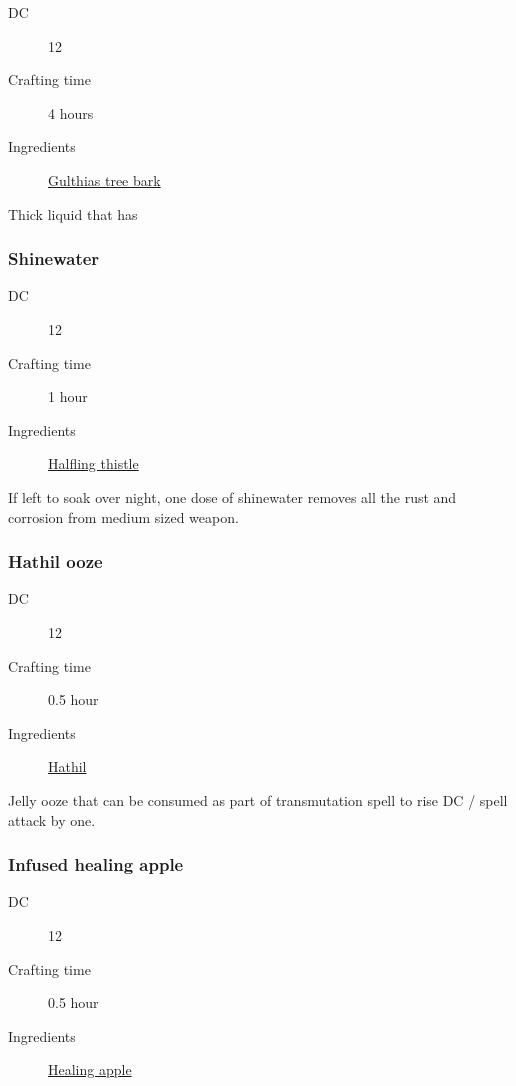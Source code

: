 \begin{description}
\item [DC] 12
\item [Crafting time] 4 hours
\item [Ingredients] \hyperref[Gulthias Tree]{Gulthias tree bark}
\end{description}

Thick liquid that has \poison\poison\poison\poison

\subsubsection{Shinewater}
\label{Shinewater}

\begin{description}
\item [DC] 12
\item [Crafting time] 1 hour
\item [Ingredients] \hyperref[Halfling Thistle]{Halfling thistle}
\end{description}

If left to soak over night, one dose of shinewater removes all the rust and corrosion 
from medium sized weapon.

\subsubsection{Hathil ooze}
\label{Hathil ooze}

\begin{description}
\item [DC] 12
\item [Crafting time] 0.5 hour
\item [Ingredients] \hyperref[Hathil]{Hathil}
\end{description}

Jelly ooze that can be consumed as part of transmutation spell to rise DC / spell attack by one.

\subsubsection{Infused healing apple}
\label{Infused healing apple}

\begin{description}
\item [DC] 12
\item [Crafting time] 0.5 hour
\item [Ingredients] \hyperref[Healing Apple Tree]{Healing apple}
\end{description}

